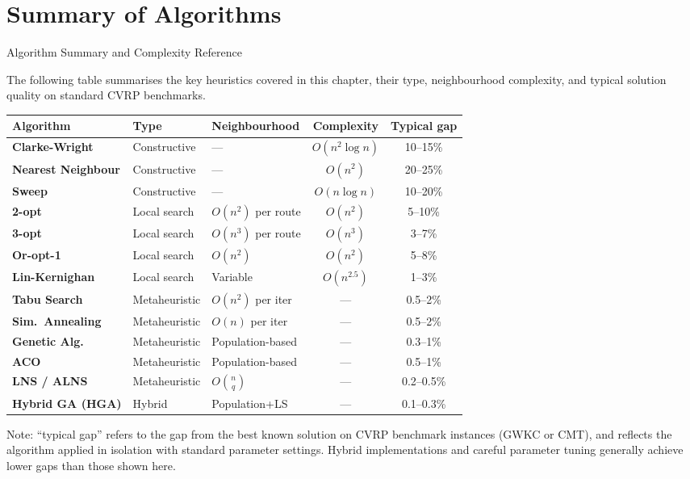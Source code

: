 \documentclass[aspectratio=169,10pt]{beamer}
\begin{document}
\section{Summary of Algorithms}

\begin{frame}[allowframebreaks]{Algorithm Summary and Complexity Reference}

  The following table summarises the key heuristics covered in this
  chapter, their type, neighbourhood complexity, and typical solution
  quality on standard CVRP benchmarks.

  \begin{center}
  \small
  \begin{tabular}{>{\bfseries}lllcc}
    \toprule
    Algorithm & Type & Neighbourhood & Complexity & Typical gap \\
    \midrule
    Clarke-Wright   & Constructive  & ---           & $O(n^2 \log n)$ & 10--15\% \\
    Nearest Neighbour & Constructive & ---           & $O(n^2)$        & 20--25\% \\
    Sweep           & Constructive  & ---           & $O(n \log n)$   & 10--20\% \\
    2-opt           & Local search  & $O(n^2)$ per route & $O(n^2)$   & 5--10\%  \\
    3-opt           & Local search  & $O(n^3)$ per route & $O(n^3)$   & 3--7\%   \\
    Or-opt-1        & Local search  & $O(n^2)$      & $O(n^2)$        & 5--8\%   \\
    Lin-Kernighan   & Local search  & Variable      & $O(n^{2.5})$    & 1--3\%   \\
    Tabu Search     & Metaheuristic & $O(n^2)$ per iter & ---          & 0.5--2\% \\
    Sim.\ Annealing & Metaheuristic & $O(n)$ per iter   & ---          & 0.5--2\% \\
    Genetic Alg.    & Metaheuristic & Population-based  & ---          & 0.3--1\% \\
    ACO             & Metaheuristic & Population-based  & ---          & 0.5--1\% \\
    LNS / ALNS      & Metaheuristic & $O\!\binom{n}{q}$ & ---         & 0.2--0.5\% \\
    Hybrid GA (HGA) & Hybrid        & Population+LS     & ---          & 0.1--0.3\% \\
    \bottomrule
  \end{tabular}
  \end{center}

  \medskip
  Note: ``typical gap'' refers to the gap from the best known solution
  on CVRP benchmark instances (GWKC or CMT), and reflects the algorithm
  applied in isolation with standard parameter settings.  Hybrid
  implementations and careful parameter tuning generally achieve lower
  gaps than those shown here.

\end{frame}
\end{document}
